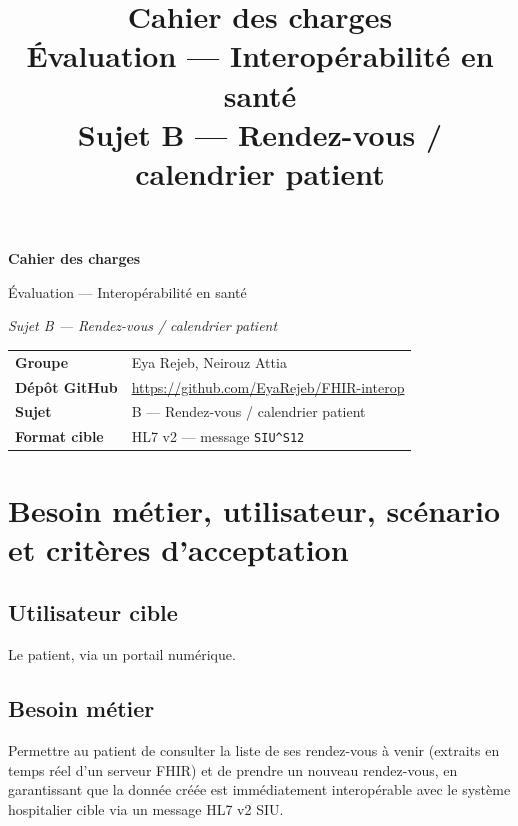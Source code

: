 \documentclass[11pt,a4paper]{article}
\title{\textbf{Cahier des charges}\\[0.3cm]
\large \'Evaluation --- Interop\'erabilit\'e en sant\'e\\
Sujet B --- Rendez-vous / calendrier patient}
\author{}
\date{}
\newcommand{\siu}{SIU\textasciicircum{}S12}
\begin{document}
\begin{titlepage}
\centering
\vspace*{2cm}
{\Huge\bfseries Cahier des charges\par}
\vspace{0.5cm}
{\Large \'Evaluation --- Interop\'erabilit\'e en sant\'e\par}
\vspace{0.3cm}
{\large\itshape Sujet B --- Rendez-vous / calendrier patient\par}
\vspace{2cm}

\renewcommand{\arraystretch}{1.6}
\begin{tabular}{ll}
\textbf{Groupe} & Eya Rejeb, Neirouz Attia \\
\textbf{D\'ep\^ot GitHub} & \url{https://github.com/EyaRejeb/FHIR-interop} \\
\textbf{Sujet} & B --- Rendez-vous / calendrier patient \\
\textbf{Format cible} & HL7 v2 --- message \texttt{\siu} \\
\end{tabular}


\end{titlepage}

\tableofcontents
\newpage

\section{Besoin m\'etier, utilisateur, sc\'enario et crit\`eres d'acceptation}

\subsection{Utilisateur cible}
Le patient, via un portail num\'erique.

\subsection{Besoin m\'etier}
Permettre au patient de consulter la liste de ses rendez-vous \`a venir (extraits en temps r\'eel d'un serveur FHIR) et de prendre un nouveau rendez-vous, en garantissant que la donn\'ee cr\'e\'ee est imm\'ediatement interop\'erable avec le syst\`eme hospitalier cible via un message HL7 v2 SIU.
\end{document}
